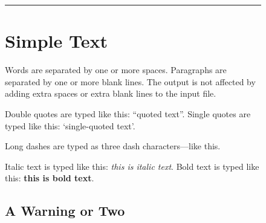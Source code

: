 \begin{figure} %


\setcounter{savesection}{\value{section}}
\setcounter{section}{0}
\setcounter{savesubsection}{\value{subsection}}
\setcounter{subsection}{0}

\setlength{\parindent}{17pt}
\setlength{\parskip}{0pt}

\noindent\rule{\textwidth}{0.8pt}

%


\section{Simple Text}          %

Words are separated by one or    more      spaces.  Paragraphs are
    separated by one or more blank lines.  The output is not affected
by adding extra spaces or extra blank lines to the input file.


Double quotes are typed like this: ``quoted text''.
Single quotes are typed like this: `single-quoted text'.

Long dashes are typed as three dash characters---like this.

Italic text is typed like this: {\em this is italic text}.
Bold   text is typed like this: {\bf this is  bold  text}.

\subsection{A Warning or Two}        %


\end{figure}

